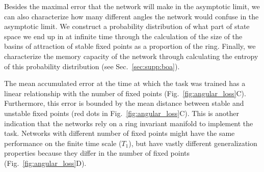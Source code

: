 \documentclass{article} %
\newcounter{ct}
\theoremstyle{definition}
\theoremstyle{remark}
\begin{document}
Besides the maximal error that the network will make in the asymptotic limit, we can also characterize how many different angles the network would confuse in the asymptotic limit.
We construct a probability distribution of what part of state space we end up in at infinite time through the calculation of the size of the basins of attraction of stable fixed points as a proportion of the ring.
Finally, we characterize the memory capacity of the network through calculating the entropy of this probability distribution (see Sec.~\ref{sec:supp:boa}).



The mean accumulated error at the time at which the task was trained has a linear relationship with the number of fixed points (Fig.~\ref{fig:angular_loss}C).
Furthermore, this error is bounded by the mean distance between stable and unstable fixed points (red dots in Fig.~\ref{fig:angular_loss}C).
This is another indication that the networks rely on a ring invariant manifold to implement the task.
Networks with different number of fixed points might have the same performance on the finite time scale ($T_1$), but have vastly different generalization properties because they differ in the number of fixed points (Fig.~\ref{fig:angular_loss}D).
\end{document}
